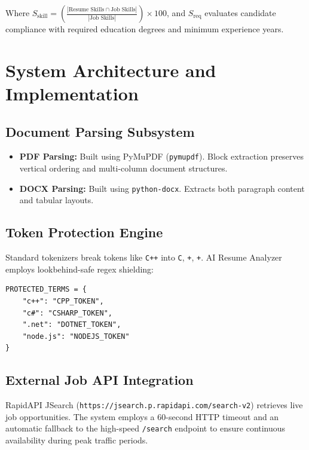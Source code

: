 \documentclass[12pt,a4paper]{report}
\begin{document}
Where $S_{\text{skill}} = \left(\frac{|\text{Resume Skills} \cap \text{Job Skills}|}{|\text{Job Skills}|}\right) \times 100$, and $S_{\text{req}}$ evaluates candidate compliance with required education degrees and minimum experience years.

\chapter{System Architecture and Implementation}

\section{Document Parsing Subsystem}
\begin{itemize}
    \item \textbf{PDF Parsing:} Built using PyMuPDF (\texttt{pymupdf}). Block extraction preserves vertical ordering and multi-column document structures.
    \item \textbf{DOCX Parsing:} Built using \texttt{python-docx}. Extracts both paragraph content and tabular layouts.
\end{itemize}

\section{Token Protection Engine}
Standard tokenizers break tokens like \texttt{C++} into \texttt{C}, \texttt{+}, \texttt{+}. AI Resume Analyzer employs lookbehind-safe regex shielding:
\begin{verbatim}
PROTECTED_TERMS = {
    "c++": "CPP_TOKEN",
    "c#": "CSHARP_TOKEN",
    ".net": "DOTNET_TOKEN",
    "node.js": "NODEJS_TOKEN"
}
\end{verbatim}

\section{External Job API Integration}
RapidAPI JSearch (\texttt{https://jsearch.p.rapidapi.com/search-v2}) retrieves live job opportunities. The system employs a 60-second HTTP timeout and an automatic fallback to the high-speed \texttt{/search} endpoint to ensure continuous availability during peak traffic periods.

\end{document}
